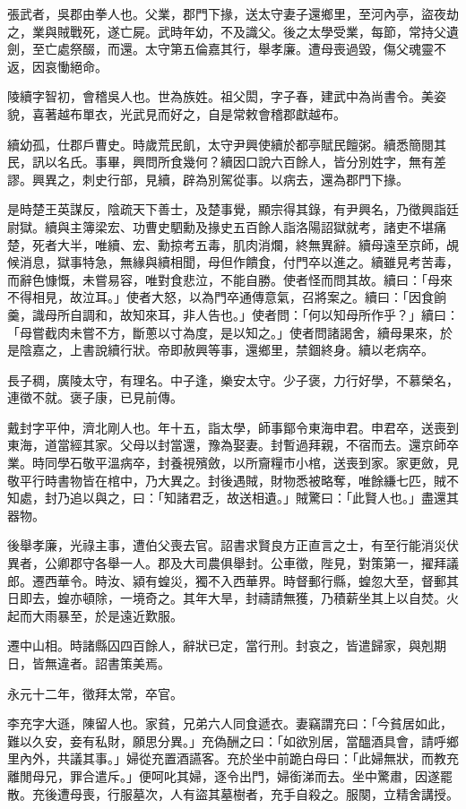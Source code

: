 \begin{pinyinscope}
張武者，吳郡由拳人也。父業，郡門下掾，送太守妻子還鄉里，至河內亭，盜夜劫之，業與賊戰死，遂亡屍。武時年幼，不及識父。後之太學受業，每節，常持父遺劍，至亡處祭醊，而還。太守第五倫嘉其行，舉孝廉。遭母喪過毀，傷父魂靈不返，因哀慟絕命。

陵續字智初，會稽吳人也。世為族姓。祖父閎，字子春，建武中為尚書令。美姿貌，喜著越布單衣，光武見而好之，自是常敕會稽郡獻越布。

續幼孤，仕郡戶曹史。時歲荒民飢，太守尹興使續於都亭賦民饘粥。續悉簡閱其民，訊以名氏。事畢，興問所食幾何？續因口說六百餘人，皆分別姓字，無有差謬。興異之，刺史行部，見續，辟為別駕從事。以病去，還為郡門下掾。

是時楚王英謀反，陰疏天下善士，及楚事覺，顯宗得其錄，有尹興名，乃徵興詣廷尉獄。續與主簿梁宏、功曹史駟勳及掾史五百餘人詣洛陽詔獄就考，諸吏不堪痛楚，死者大半，唯續、宏、勳掠考五毒，肌肉消爛，終無異辭。續母遠至京師，覘候消息，獄事特急，無緣與續相聞，母但作饋食，付門卒以進之。續雖見考苦毒，而辭色慷慨，未嘗易容，唯對食悲泣，不能自勝。使者怪而問其故。續曰：「母來不得相見，故泣耳。」使者大怒，以為門卒通傳意氣，召將案之。續曰：「因食餉羹，識母所自調和，故知來耳，非人告也。」使者問：「何以知母所作乎？」續曰：「母嘗截肉未嘗不方，斷蔥以寸為度，是以知之。」使者問諸謁舍，續母果來，於是陰嘉之，上書說續行狀。帝即赦興等事，還鄉里，禁錮終身。續以老病卒。

長子稠，廣陵太守，有理名。中子逢，樂安太守。少子褒，力行好學，不慕榮名，連徵不就。褒子康，已見前傳。

戴封字平仲，濟北剛人也。年十五，詣太學，師事鄮令東海申君。申君卒，送喪到東海，道當經其家。父母以封當還，豫為娶妻。封暫過拜親，不宿而去。還京師卒業。時同學石敬平溫病卒，封養視殯斂，以所齎糧巿小棺，送喪到家。家更斂，見敬平行時書物皆在棺中，乃大異之。封後遇賊，財物悉被略奪，唯餘縑七匹，賊不知處，封乃追以與之，曰：「知諸君乏，故送相遺。」賊驚曰：「此賢人也。」盡還其器物。

後舉孝廉，光祿主事，遭伯父喪去官。詔書求賢良方正直言之士，有至行能消災伏異者，公卿郡守各舉一人。郡及大司農俱舉封。公車徵，陛見，對策第一，擢拜議郎。遷西華令。時汝、潁有蝗災，獨不入西華界。時督郵行縣，蝗忽大至，督郵其日即去，蝗亦頓除，一境奇之。其年大旱，封禱請無獲，乃積薪坐其上以自焚。火起而大雨暴至，於是遠近歎服。

遷中山相。時諸縣囚四百餘人，辭狀已定，當行刑。封哀之，皆遣歸家，與剋期日，皆無違者。詔書策美焉。

永元十二年，徵拜太常，卒官。

李充字大遜，陳留人也。家貧，兄弟六人同食遞衣。妻竊謂充曰：「今貧居如此，難以久安，妾有私財，願思分異。」充偽酬之曰：「如欲別居，當醞酒具會，請呼鄉里內外，共議其事。」婦從充置酒讌客。充於坐中前跪白母曰：「此婦無狀，而教充離閒母兄，罪合遣斥。」便呵叱其婦，逐令出門，婦銜涕而去。坐中驚肅，因遂罷散。充後遭母喪，行服墓次，人有盜其墓樹者，充手自殺之。服闋，立精舍講授。


\end{pinyinscope}
